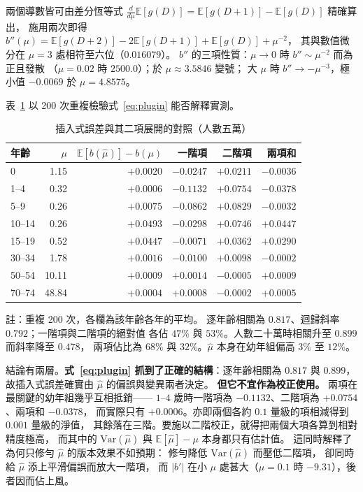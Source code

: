 \documentclass[UTF8, fontset=macnew, a4paper, 12pt]{ctexart}
\newcommand{\Ex}{\mathbb{E}}
\begin{document}
兩個導數皆可由差分恆等式
$\frac{d}{d\mu}\Ex[g(D)]=\Ex[g(D{+}1)]-\Ex[g(D)]$ 精確算出，
施用兩次即得
$b''(\mu)=\Ex[g(D{+}2)]-2\Ex[g(D{+}1)]+\Ex[g(D)]+\mu^{-2}$，
其與數值微分在 $\mu=3$ 處相符至六位（$0.016079$）。
$b''$ 的三項性質：$\mu\to0$ 時 $b''\sim\mu^{-2}$ 而為正且發散
（$\mu=0.02$ 時 $2500.0$）；於 $\mu\approx3.5846$ 變號；
大 $\mu$ 時 $b''\to-\mu^{-3}$，極小值 $-0.0069$ 於 $\mu=4.8575$。

表~\ref{tab:higher} 以 200 次重複檢驗式~\eqref{eq:plugin} 能否解釋實測。

\begin{table}[H]
\centering
\caption{插入式誤差與其二項展開的對照（人數五萬）}
\small
\renewcommand{\arraystretch}{1.1}
\begin{tabular}{lrrrrr}
\toprule
年齡 & $\mu$ & $\Ex[b(\hat\mu)]-b(\mu)$ & 一階項 & 二階項 & 兩項和\\
\midrule
0      & 1.15 & $+0.0020$ & $-0.0247$ & $+0.0211$ & $-0.0036$\\
1--4   & 0.32 & $+0.0006$ & $-0.1132$ & $+0.0754$ & $-0.0378$\\
5--9   & 0.26 & $+0.0075$ & $-0.0862$ & $+0.0829$ & $-0.0032$\\
10--14 & 0.26 & $+0.0493$ & $-0.0298$ & $+0.0746$ & $+0.0447$\\
15--19 & 0.52 & $+0.0447$ & $-0.0071$ & $+0.0362$ & $+0.0290$\\
30--34 & 1.78 & $+0.0016$ & $-0.0100$ & $+0.0098$ & $-0.0002$\\
50--54 & 10.11 & $+0.0009$ & $+0.0014$ & $-0.0005$ & $+0.0009$\\
70--74 & 48.84 & $+0.0004$ & $+0.0008$ & $-0.0002$ & $+0.0005$\\
\bottomrule
\end{tabular}

\vspace{2pt}
\parbox{0.92\textwidth}{\footnotesize 註：重複 200 次，各欄為該年齡各年的平均。
逐年齡相關為 $0.817$、迴歸斜率 $0.792$；一階項與二階項的絕對值
各佔 $47\%$ 與 $53\%$。人數二十萬時相關升至 $0.899$ 而斜率降至 $0.478$，
兩項佔比為 $68\%$ 與 $32\%$。$\hat\mu$ 本身在幼年組偏高 $3\%$ 至 $12\%$。}
\label{tab:higher}
\end{table}

結論有兩層。\textbf{式~\eqref{eq:plugin} 抓到了正確的結構}：逐年齡相關為
$0.817$ 與 $0.899$，故插入式誤差確實由 $\hat\mu$ 的偏誤與變異兩者決定。
\textbf{但它不宜作為校正使用。} 兩項在最關鍵的幼年組幾乎互相抵銷——
$1$--$4$ 歲時一階項為 $-0.1132$、二階項為 $+0.0754$、兩項和 $-0.0378$，
而實際只有 $+0.0006$。亦即兩個各約 $0.1$ 量級的項相減得到 $0.001$ 量級的淨值，
其餘落在三階。要施以二階校正，就得把兩個大項各算到相對精度極高，
而其中的 $\mathrm{Var}(\hat\mu)$ 與 $\Ex[\hat\mu]-\mu$ 本身都只有估計值。
這同時解釋了為何只修勻 $\hat\mu$ 的版本效果不如預期：
修勻降低 $\mathrm{Var}(\hat\mu)$ 而壓低二階項，
卻同時給 $\hat\mu$ 添上平滑偏誤而放大一階項，
而 $|b'|$ 在小 $\mu$ 處甚大（$\mu=0.1$ 時 $-9.31$），後者因而佔上風。
\end{document}
